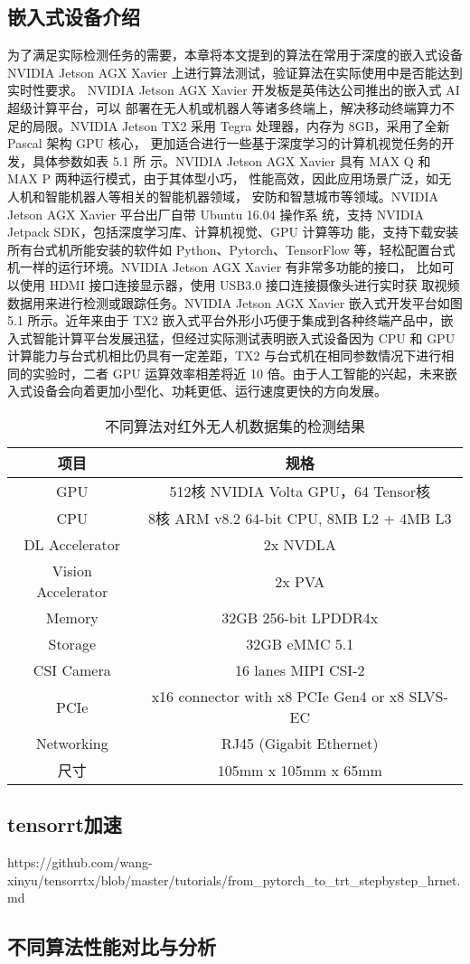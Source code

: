 \subsection{嵌入式设备介绍}
为了满足实际检测任务的需要，本章将本文提到的算法在常用于深度的嵌入式设备 NVIDIA
Jetson AGX Xavier 上进行算法测试，验证算法在实际使用中是否能达到实时性要求。
NVIDIA Jetson AGX Xavier 开发板是英伟达公司推出的嵌入式 AI 超级计算平台，可以
部署在无人机或机器人等诸多终端上，解决移动终端算力不足的局限。NVIDIA
Jetson TX2 采用 Tegra 处理器，内存为 8GB，采用了全新 Pascal 架构 GPU 核心，
更加适合进行一些基于深度学习的计算机视觉任务的开发，具体参数如表 5.1 所
示。NVIDIA Jetson AGX Xavier 具有 MAX Q 和 MAX P 两种运行模式，由于其体型小巧，
性能高效，因此应用场景广泛，如无人机和智能机器人等相关的智能机器领域，
安防和智慧城市等领域。NVIDIA Jetson AGX Xavier 平台出厂自带 Ubuntu 16.04 操作系
统，支持 NVIDIA Jetpack SDK，包括深度学习库、计算机视觉、GPU 计算等功
能，支持下载安装所有台式机所能安装的软件如 Python、Pytorch、TensorFlow
等，轻松配置台式机一样的运行环境。NVIDIA Jetson AGX Xavier 有非常多功能的接口，
比如可以使用 HDMI 接口连接显示器，使用 USB3.0 接口连接摄像头进行实时获
取视频数据用来进行检测或跟踪任务。NVIDIA Jetson AGX Xavier 嵌入式开发平台如图
5.1 所示。近年来由于 TX2 嵌入式平台外形小巧便于集成到各种终端产品中，嵌
入式智能计算平台发展迅猛，但经过实际测试表明嵌入式设备因为 CPU 和 GPU
计算能力与台式机相比仍具有一定差距，TX2 与台式机在相同参数情况下进行相
同的实验时，二者 GPU 运算效率相差将近 10 倍。由于人工智能的兴起，未来嵌
入式设备会向着更加小型化、功耗更低、运行速度更快的方向发展。

\begin{table}[htbp]
    \caption{不同算法对红外无人机数据集的检测结果}
    \vspace{0.5em}\centering\wuhao
    \begin{tabular}{cc}
    \toprule
    项目 & 规格\\
    \midrule
    GPU & 512核 NVIDIA Volta GPU，64 Tensor核\\
    CPU & 8核 ARM v8.2 64-bit CPU, 8MB L2 + 4MB L3\\
    DL Accelerator & 2x NVDLA\\
    Vision Accelerator & 2x PVA\\
    Memory & 32GB 256-bit LPDDR4x\\
    Storage & 32GB eMMC 5.1\\
    CSI Camera & 16 lanes MIPI CSI-2\\
    PCIe & x16 connector with x8 PCIe Gen4 or x8 SLVS-EC\\
    Networking & RJ45 (Gigabit Ethernet)\\
    尺寸 & 105mm x 105mm x 65mm\\
    \bottomrule
    \end{tabular}
    \label{t1}
\end{table}

\subsection{tensorrt加速}
https://github.com/wang-xinyu/tensorrtx/blob/master/tutorials/from_pytorch_to_trt_stepbystep_hrnet.md

\subsection{不同算法性能对比与分析}


